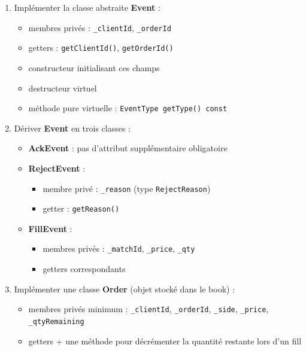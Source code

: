 \documentclass[11pt,a4paper]{article}
\begin{document}
\begin{enumerate}
  \item Implémenter la classe abstraite \textbf{Event} :
  \begin{itemize}
    \item membres privés : \texttt{\_clientId}, \texttt{\_orderId}
    \item getters : \texttt{getClientId()}, \texttt{getOrderId()}
    \item constructeur initialisant ces champs
    \item destructeur virtuel
    \item méthode pure virtuelle : \texttt{EventType getType() const}
  \end{itemize}

  \item Dériver \textbf{Event} en trois classes :
  \begin{itemize}
    \item \textbf{AckEvent} : pas d’attribut supplémentaire obligatoire
    \item \textbf{RejectEvent} :
      \begin{itemize}
        \item membre privé : \texttt{\_reason} (type \texttt{RejectReason})
        \item getter : \texttt{getReason()}
      \end{itemize}
    \item \textbf{FillEvent} :
      \begin{itemize}
        \item membres privés : \texttt{\_matchId}, \texttt{\_price}, \texttt{\_qty}
        \item getters correspondants
      \end{itemize}
  \end{itemize}

  \item Implémenter une classe \textbf{Order} (objet stocké dans le book) :
  \begin{itemize}
    \item membres privés minimum : \texttt{\_clientId}, \texttt{\_orderId}, \texttt{\_side}, \texttt{\_price}, \texttt{\_qtyRemaining}
    \item getters + une méthode pour décrémenter la quantité restante lors d’un fill
  \end{itemize}


\end{enumerate}
\end{document}
